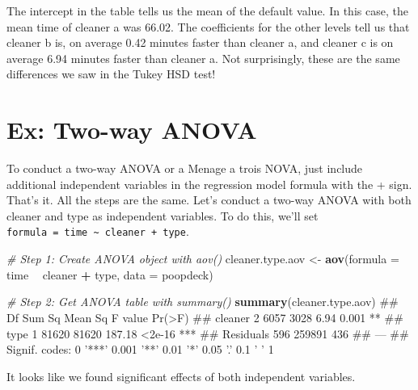 \documentclass[]{book}
\newenvironment{Shaded}{\begin{snugshade}}{\end{snugshade}}
\newcommand{\KeywordTok}[1]{\textcolor[rgb]{0.13,0.29,0.53}{\textbf{#1}}}
\newcommand{\DataTypeTok}[1]{\textcolor[rgb]{0.13,0.29,0.53}{#1}}
\newcommand{\StringTok}[1]{\textcolor[rgb]{0.31,0.60,0.02}{#1}}
\newcommand{\CommentTok}[1]{\textcolor[rgb]{0.56,0.35,0.01}{\textit{#1}}}
\newcommand{\OperatorTok}[1]{\textcolor[rgb]{0.81,0.36,0.00}{\textbf{#1}}}
\newcommand{\NormalTok}[1]{#1}
\theoremstyle{definition}
\theoremstyle{definition}
\theoremstyle{remark}
\begin{document}
The intercept in the table tells us the mean of the default value. In
this case, the mean time of cleaner a was 66.02. The coefficients for
the other levels tell us that cleaner b is, on average 0.42 minutes
faster than cleaner a, and cleaner c is on average 6.94 minutes faster
than cleaner a. Not surprisingly, these are the same differences we saw
in the Tukey HSD test!

\section{Ex: Two-way ANOVA}\label{ex-two-way-anova}

To conduct a two-way ANOVA or a Menage a trois NOVA, just include
additional independent variables in the regression model formula with
the + sign. That's it. All the steps are the same. Let's conduct a
two-way ANOVA with both cleaner and type as independent variables. To do
this, we'll set
\texttt{formula\ =\ time\ \textasciitilde{}\ cleaner\ +\ type}.

\begin{Shaded}
\begin{Highlighting}[]
\CommentTok{# Step 1: Create ANOVA object with aov()}
\NormalTok{cleaner.type.aov <-}\StringTok{ }\KeywordTok{aov}\NormalTok{(}\DataTypeTok{formula =}\NormalTok{ time }\OperatorTok{~}\StringTok{ }\NormalTok{cleaner }\OperatorTok{+}\StringTok{ }\NormalTok{type,}
                        \DataTypeTok{data =}\NormalTok{ poopdeck)}
\end{Highlighting}
\end{Shaded}

\begin{Shaded}
\begin{Highlighting}[]
\CommentTok{# Step 2: Get ANOVA table with summary()}
\KeywordTok{summary}\NormalTok{(cleaner.type.aov)}
\NormalTok{##              Df Sum Sq Mean Sq F value Pr(>F)    }
\NormalTok{## cleaner       2   6057    3028    6.94  0.001 ** }
\NormalTok{## type          1  81620   81620  187.18 <2e-16 ***}
\NormalTok{## Residuals   596 259891     436                   }
\NormalTok{## ---}
\NormalTok{## Signif. codes:  0 '***' 0.001 '**' 0.01 '*' 0.05 '.' 0.1 ' ' 1}
\end{Highlighting}
\end{Shaded}

It looks like we found significant effects of both independent
variables.
\end{document}
